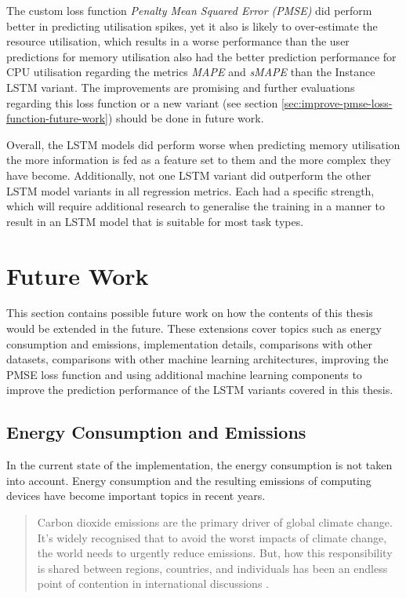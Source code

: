        The custom loss function \emph{Penalty Mean Squared Error (PMSE)} did perform better in predicting utilisation spikes, yet it also is likely to over-estimate the resource utilisation, which results in a worse performance than the user predictions for memory utilisation also had the better prediction performance for CPU utilisation regarding the metrics \emph{MAPE} and \emph{sMAPE} than the Instance LSTM variant.
        The improvements are promising and further evaluations regarding this loss function or a new variant (see section \ref{sec:improve-pmse-loss-function-future-work}) should be done in future work.

        Overall, the LSTM models did perform worse when predicting memory utilisation the more information is fed as a feature set to them and the more complex they have become.
        Additionally, not one LSTM variant did outperform the other LSTM model variants in all regression metrics.
        Each had a specific strength, which will require additional research to generalise the training in a manner to result in an LSTM model that is suitable for most task types. 



    \section{Future Work}
    \label{sec:future-work}

        This section contains possible future work on how the contents of this thesis would be extended in the future.
        These extensions cover topics such as energy consumption and \COTWO emissions, implementation details, comparisons with other datasets, comparisons with other machine learning architectures, improving the PMSE loss function and using additional machine learning components to improve the prediction performance of the LSTM variants covered in this thesis.

        \subsection{Energy Consumption and \COTWO Emissions}
        \label{sec:energy-consumption-future-work}

            In the current state of the implementation, the energy consumption is not taken into account.
            Energy consumption and the resulting \COTWO emissions of computing devices have become important topics in recent years.

            \begin{quote}
                Carbon dioxide emissions are the primary driver of global climate change. It's widely recognised that to avoid the worst impacts of climate change, the world needs to urgently reduce emissions. But, how this responsibility is shared between regions, countries, and individuals has been an endless point of contention in international discussions \cite{ritchieCOGreenhouseGas2020}. 
            \end{quote}

